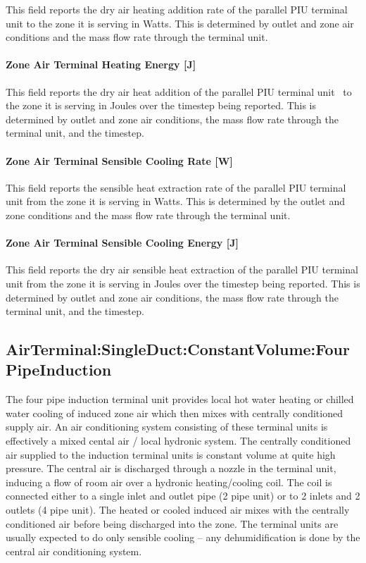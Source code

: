 This field reports the dry air heating addition rate of the parallel PIU terminal unit to the zone it is serving in Watts. This is determined by outlet and zone air conditions and the mass flow rate through the terminal unit.

\paragraph{Zone Air Terminal Heating Energy {[}J{]}}\label{zone-air-terminal-heating-energy-j-1}

This field reports the dry air heat addition of the parallel PIU terminal unit~ to the zone it is serving in Joules over the timestep being reported. This is determined by outlet and zone air conditions, the mass flow rate through the terminal unit, and the timestep.

\paragraph{Zone Air Terminal Sensible Cooling Rate {[}W{]}}\label{zone-air-terminal-sensible-cooling-rate-w-2}

This field reports the sensible heat extraction rate of the parallel PIU terminal unit from the zone it is serving in Watts. This is determined by the outlet and zone conditions and the mass flow rate through the terminal unit.

\paragraph{Zone Air Terminal Sensible Cooling Energy {[}J{]}}\label{zone-air-terminal-sensible-cooling-energy-j-2}

This field reports the dry air sensible heat extraction of the parallel PIU terminal unit from the zone it is serving in Joules over the timestep being reported. This is determined by outlet and zone air conditions, the mass flow rate through the terminal unit, and the timestep.

\subsection{AirTerminal:SingleDuct:ConstantVolume:FourPipeInduction}\label{airterminalsingleductconstantvolumefourpipeinduction}

The four pipe induction terminal unit provides local hot water heating or chilled water cooling of induced zone air which then mixes with centrally conditioned supply air. An air conditioning system consisting of these terminal units is effectively a mixed cental air / local hydronic system. The centrally conditioned air supplied to the induction terminal units is constant volume at quite high pressure. The central air is discharged through a nozzle in the terminal unit, inducing a flow of room air over a hydronic heating/cooling coil. The coil is connected either to a single inlet and outlet pipe (2 pipe unit) or to 2 inlets and 2 outlets (4 pipe unit). The heated or cooled induced air mixes with the centrally conditioned air before being discharged into the zone. The terminal units are usually expected to do only sensible cooling -- any dehumidification is done by the central air conditioning system.

